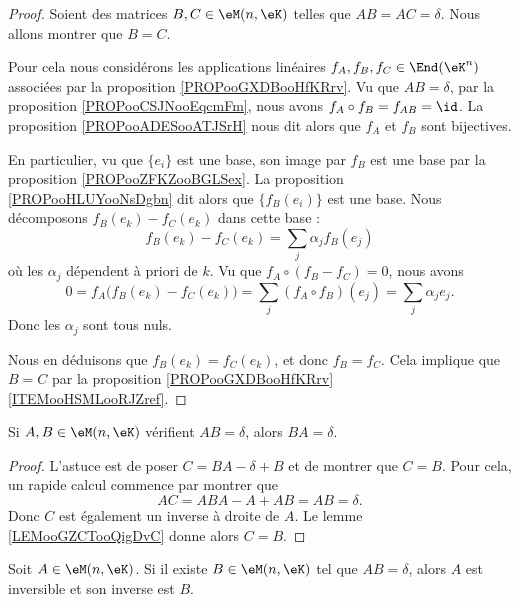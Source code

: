 \begin{proof}
	Soient des matrices \( B,C\in \eM(n,\eK)\) telles que \( AB=AC=\delta\). Nous allons montrer que \( B=C\).

	Pour cela nous considérons les applications linéaires \( f_A, f_B, f_C\in \End(\eK^n)\) associées par la proposition \ref{PROPooGXDBooHfKRrv}. Vu que \( AB=\delta\), par la proposition \ref{PROPooCSJNooEqcmFm}, nous avons \( f_A\circ f_B = f_{AB}=\id\). La proposition \ref{PROPooADESooATJSrH} nous dit alors que \( f_A\) et \( f_B\) sont bijectives.

	En particulier, vu que \( \{e_i\}\) est une base, son image par \( f_B\) est une base par la proposition \ref{PROPooZFKZooBGLSex}. La proposition \ref{PROPooHLUYooNsDgbn} dit alors que \( \{f_B(e_i)\}\) est une base. Nous décomposons \( f_B(e_k)-f_C(e_k)\) dans cette base :
	\begin{equation}
		f_B(e_k)-f_C(e_k)=\sum_j\alpha_jf_B(e_j)
	\end{equation}
	où les \( \alpha_j\) dépendent à priori de \( k\). Vu que \( f_A\circ(f_B-f_C)=0\), nous avons
	\begin{equation}
		0=f_A\big( f_B(e_k)-f_C(e_k) \big)=\sum_j(f_A\circ f_B)(e_j)=\sum_j\alpha_je_j.
	\end{equation}
	Donc les \( \alpha_j\) sont tous nuls.

	Nous en déduisons que \( f_B(e_k)=f_C(e_k)\), et donc \( f_B=f_C\). Cela implique que \( B=C\) par la proposition \ref{PROPooGXDBooHfKRrv}\ref{ITEMooHSMLooRJZref}.
\end{proof}

\begin{proposition}      \label{PROPooECIIooVMCIwz}
	Si \( A,B\in \eM(n,\eK)\) vérifient \( AB=\delta\), alors \( BA=\delta\).
\end{proposition}

\begin{proof}
	L'astuce est de poser \( C=BA-\delta+B\) et de montrer que \( C=B\). Pour cela, un rapide calcul commence par montrer que
	\begin{equation}
		AC=ABA-A+AB=AB=\delta.
	\end{equation}
	Donc \( C\) est également un inverse à droite de \( A\). Le lemme \ref{LEMooGZCTooQigDvC} donne alors \( C=B\).
\end{proof}

\begin{corollary}       \label{CORooBQLXooTeVfgb}
	Soit \( A\in \eM(n,\eK)\). Si il existe \( B\in \eM(n,\eK)\) tel que \( AB=\delta\), alors \( A\) est inversible et son inverse est \( B\).
\end{corollary}

